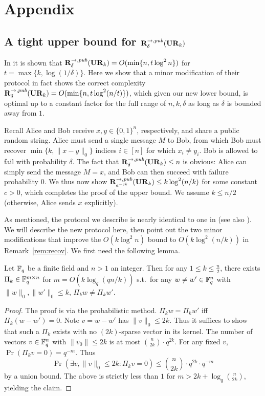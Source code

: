 \section{Appendix}

\subsection{A tight upper bound for $\mathbf{R}^{\rightarrow,pub}_\delta(\mathbf{UR}_k)$}\label{sec:upper-bound}

In \cite[Proposition 1]{JowhariST11} it is shown that $\mathbf{R}^{\rightarrow,pub}_\delta(\mathbf{UR}_k) = O(\min\{n,t\log^2 n\})$ for $t = \max\{k,\log(1/\delta)\}$. Here we show that a minor modification of their protocol in fact shows the correct complexity $\mathbf{R}^{\rightarrow,pub}_\delta(\mathbf{UR}_k) = O(\min\{n,t\log^2(n/t)\})$, which given our new lower bound, is optimal up to a constant factor for the full range of $n,k,\delta$ as long as $\delta$ is bounded away from $1$.

Recall Alice and Bob receive $x, y\in\{0,1\}^n$, respectively, and share a public random string. Alice must send a single message $M$ to Bob, from which Bob must recover $\min\{k, \|x-y\|_0\}$ indices $i\in[n]$ for which $x_i\neq y_i$. Bob is allowed to fail with probability $\delta$. The fact that $\mathbf{R}^{\rightarrow,pub}_\delta(\mathbf{UR}_k) \le n$ is obvious: Alice can simply send the message $M = x$, and Bob can then succeed with failure probability $0$. We thus now show $\mathbf{R}^{\rightarrow,pub}_{e^{-ck}}(\mathbf{UR}_k) \le k\log^2(n/k)$ for some constant $c>0$, which completes the proof of the upper bound. We assume $k\le n/2$ (otherwise, Alice sends $x$ explicitly).

As mentioned, the protocol we describe is nearly identical to one in \cite{JowhariST11} (see also \cite{CormodeF14}). We will describe the new protocol here, then point out the two minor modifications that improve the $O(k\log^2 n)$ bound to $O(k\log^2(n/k))$ in Remark~\ref{rem:recov}. We first need the following lemma.

\begin{lemma}\label{lem:sparse-recov}
Let $\mathbb{F}_q$ be a finite field and $n>1$ an integer. Then for any $1\le k\le \frac n2$, there exists $\Pi_k\in \mathbb{F}_q^{m\times n}$ for $m = O(k\log_q(qn/k))$ s.t.\ for any $w\neq w'\in\mathbb{F}_q^n$ with $\|w\|_0, \|w'\|_0 \le k$, $\Pi_k w \neq \Pi_k w'$.
\end{lemma}
\begin{proof}
The proof is via the probabilistic method. $\Pi_k w = \Pi_k w'$ iff $\Pi_k (w - w') = 0$. Note $v = w-w'$ has $\|v\|_0 \le 2k$. Thus it suffices to show that such a $\Pi_k$ exists with no $(2k)$-sparse vector in its kernel. The number of vectors $v\in\mathbb{F}_q^n$ with $\|v_0\| \le 2k$ is at most $\binom{n}{2k}\cdot q^{2k}$. For any fixed $v$, $\Pr(\Pi_k v = 0) = q^{-m}$. Thus 
$$\Pr(\exists v, \|v\|_0 \le 2k: \Pi_k v = 0) \le \binom{n}{2k}\cdot q^{2k} \cdot q^{-m}$$ 
by a union bound. The above is strictly less than $1$ for $m > 2k + \log_q\binom{n}{2k}$, yielding the claim.
\end{proof}

